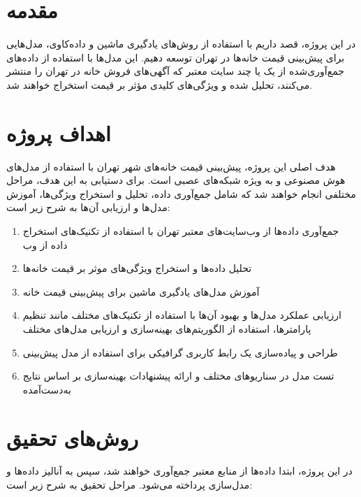 \documentclass{article}
\title{\assignment}
\author{
    محمدامین توفیق \\
    \texttt{m.toufigh@email.kntu.ac.ir} \\
    \and
    محمدمهدی کرمی \\
    \texttt{mmehdi.karami@email.kntu.ac.ir}
}
\date{\university \\
\faculty \\
\course}
\begin{document}
\maketitle

\section{مقدمه}
در این پروژه، قصد داریم با استفاده از روش‌های یادگیری ماشین و داده‌کاوی، مدل‌هایی برای پیش‌بینی قیمت خانه‌ها در تهران توسعه دهیم. این مدل‌ها با استفاده از داده‌های جمع‌آوری‌شده از یک یا چند سایت معتبر که آگهی‌های فروش خانه در تهران را منتشر می‌کنند، تحلیل شده و ویژگی‌های کلیدی مؤثر بر قیمت استخراج خواهند شد.

\section{اهداف پروژه}
هدف اصلی این پروژه، پیش‌بینی قیمت خانه‌های شهر تهران با استفاده از مدل‌های هوش مصنوعی و به ویژه شبکه‌های عصبی است. برای دستیابی به این هدف، مراحل مختلفی انجام خواهند شد که شامل جمع‌آوری داده، تحلیل و استخراج ویژگی‌ها، آموزش مدل‌ها و ارزیابی آن‌ها به شرح زیر است:

\begin{enumerate}
    \item جمع‌آوری داده‌ها از وب‌سایت‌های معتبر تهران با استفاده از تکنیک‌های استخراج داده از وب
    \item تحلیل داده‌ها و استخراج ویژگی‌های موثر بر قیمت خانه‌ها
    \item آموزش مدل‌های یادگیری ماشین برای پیش‌بینی قیمت خانه
    \item ارزیابی عملکرد مدل‌ها و بهبود آن‌ها با استفاده از تکنیک‌های مختلف مانند تنظیم پارامترها، استفاده از الگوریتم‌های بهینه‌سازی و ارزیابی مدل‌های مختلف
    \item طراحی و پیاده‌سازی یک رابط کاربری گرافیکی برای استفاده از مدل پیش‌بینی
    \item تست مدل در سناریوهای مختلف و ارائه پیشنهادات بهینه‌سازی بر اساس نتایج به‌دست‌آمده
\end{enumerate}

\section{روش‌های تحقیق}
در این پروژه، ابتدا داده‌ها از منابع معتبر جمع‌آوری خواهند شد، سپس به آنالیز داده‌ها و مدل‌سازی پرداخته می‌شود. مراحل تحقیق به شرح زیر است:
\end{document}
